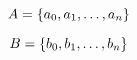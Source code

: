 \documentclass[10pt]{article}
\author{2019-12345 BayMinimum}
\date{}
\begin{document}
	\makeboxedtitle
	

	\noindent \lipsum[1]


	$$A = \longset{a_0}{a_1}{a_n}$$

	\noindent \lipsum[2]

	$$B = \longset{b_0}{b_1}{b_n}$$

	\noindent \lipsum[3]
\end{document}
